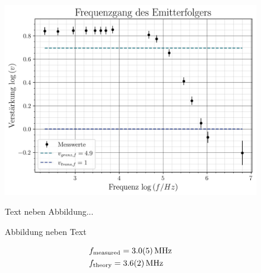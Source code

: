     \begin{figure}[H]
        \centering
        \begin{minipage}{0.4\textwidth}
            \centering
            \includegraphics[width=\linewidth]{figs/V4_2e_emitter.jpg}
            \caption{Abbildung neben Text}
        \end{minipage} 
        \hspace{1cm}
        \begin{minipage}{0.4\textwidth}
            Text neben Abbildung... 
        \end{minipage}
    \end{figure}


    \begin{align}
        & f\sub{measured} = \SI{3.0 \pm 0.5}{\mega\hertz} \\
        & f\sub{theory} = \SI{3.6(2)}{\mega\hertz} 
    \end{align}
